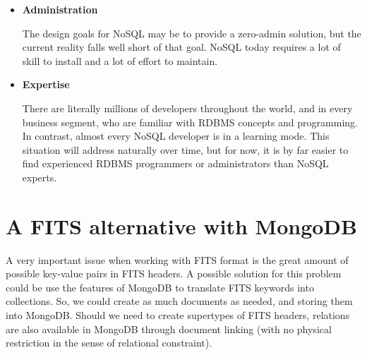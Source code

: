 \begin{itemize}
\item \textbf{Administration}

The design goals for NoSQL may be to provide a zero-admin solution, but the current reality falls well short of that goal. NoSQL today requires a lot of skill to install and a lot of effort to maintain.

\item \textbf{Expertise}

There are literally millions of developers throughout the world, and in every business segment, who are familiar with RDBMS concepts and programming. In contrast, almost every NoSQL developer is in a learning mode. This situation will address naturally over time, but for now, it is by far easier to find experienced RDBMS programmers or administrators than NoSQL experts.

\end{itemize}


\section{A FITS alternative with MongoDB}

A very important issue when working with FITS format is the great amount of possible key-value pairs in FITS headers. A possible solution for this problem could be use the features of MongoDB to translate FITS keywords into collections. So, we could create as much documents as needed, and storing them into MongoDB. Should we need to create supertypes of FITS headers, relations are also available in MongoDB through document linking (with no physical restriction in the sense of relational constraint).

